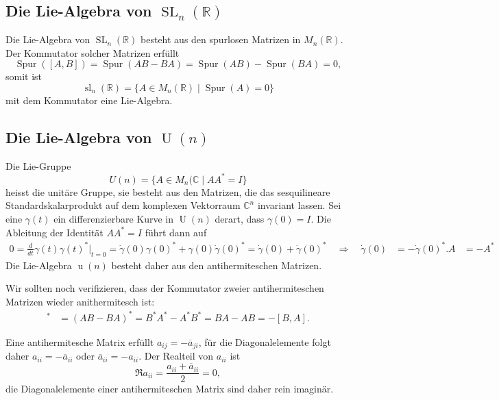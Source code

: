 \subsection{Die Lie-Algebra von $\operatorname{SL}_n(\mathbb{R})$}
Die Lie-Algebra von $\operatorname{SL}_n(\mathbb{R})$ besteht aus den
spurlosen Matrizen in $M_n(\mathbb{R})$.
Der Kommutator solcher Matrizen erfüllt
\[
\operatorname{Spur}([A,B])
=
\operatorname{Spur}(AB-BA)
=
\operatorname{Spur}(AB)-\operatorname{Spur}(BA)
=
0,
\]
somit ist 
\[
\operatorname{sl}_n(\mathbb{R})
=
\{
A\in M_n(\mathbb{R})\;|\; \operatorname{Spur}(A)=0
\}
\]
mit dem Kommutator eine Lie-Algebra.

%
%
\subsection{Die Lie-Algebra von $\operatorname{U}(n)$}
Die Lie-Gruppe
\[
U(n)
=
\{
A\in M_n(\mathbb{C}
\;|\;
AA^*=I
\}
\]
heisst die unitäre Gruppe, sie besteht aus den Matrizen, die
das sesquilineare Standardskalarprodukt auf dem komplexen
Vektorraum $\mathbb{C}^n$ invariant lassen.
Sei eine $\gamma(t)$ ein differenzierbare Kurve in $\operatorname{U}(n)$
derart, dass $\gamma(0)=I$.
Die Ableitung der Identität $AA^*=I$ führt dann auf 
\begin{align*}
0
=
\frac{d}{dt}
\gamma(t)\gamma(t)^*
\bigg|_{t=0}
=
\dot{\gamma}(0)\gamma(0)^*
+
\gamma(0)\dot{\gamma}(0)^*
=
\dot{\gamma}(0)
+
\dot{\gamma}(0)^*
\quad\Rightarrow\quad
\dot{\gamma}(0)&=-\dot{\gamma}(0)^*.
A&=-A^*
\end{align*}
Die Lie-Algebra $\operatorname{u}(n)$ besteht daher aus den antihermiteschen
Matrizen.

Wir sollten noch verifizieren, dass der Kommutator zweier antihermiteschen
Matrizen wieder anithermitesch ist:
\begin{align*}
[A,B]^*
&=
(AB-BA)^*
=
B^*A^*-A^*B^*
=
BA - AB
=
-[B,A].
\end{align*}

Eine antihermitesche Matrix erfüllt $a_{ij}=-\overline{a}_{ji}$,
für die Diagonalelemente folgt daher $a_{ii} = -\overline{a}_{ii}$
oder $\overline{a}_{ii}=-a_{ii}$.
Der Realteil von $a_{ii}$ ist
\[
\Re a_{ii}
=
\frac{a_{ii}+\overline{a}_{ii}}2
=
0,
\]
die Diagonalelemente einer antihermiteschen Matrix sind daher rein
imaginär.


%
%
